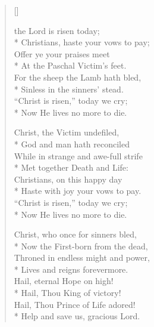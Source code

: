 \newHymn
{}

\begin{verse}[\versewidth]

 the Lord is risen today; \\*
Christians, haste your vows to pay; \\
Offer ye your praises meet \\*
At the Paschal Victim's feet. \\
For the sheep the Lamb hath bled, \\*
Sinless in the sinners' stead. \\
``Christ is risen,'' today we cry; \\*
Now He lives no more to die. 

Christ, the Victim undefiled, \\*
God and man hath reconciled \\
While in strange and awe-full strife\\*
Met together Death and Life: \\
Christians, on this happy day\\*
Haste with joy your vows to pay. \\
``Christ is risen,'' today we cry; \\*
Now He lives no more to die. 

Christ, who once for sinners bled,\\*
Now the First-born from the dead, \\
Throned in endless might and power, \\*
Lives and reigns forevermore. \\
Hail, eternal Hope on high!\\*
Hail, Thou King of victory! \\
Hail, Thou Prince of Life adored!\\*
Help and save us, gracious Lord. 

\end{verse}

